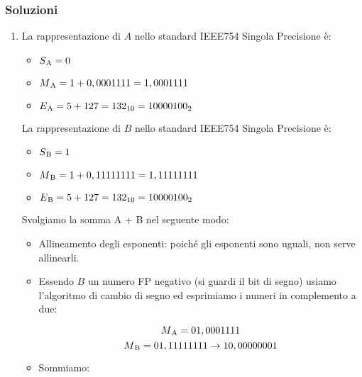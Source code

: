 \documentclass{article}
\begin{document}
\subsubsection{Soluzioni}
\begin{enumerate}
    \item La rappresentazione di $A$ nello standard IEEE754 Singola Precisione è:
        \begin{itemize}
            \item[] $S\textsubscript{A}=0$
            \item[] $M\textsubscript{A}=1+0,0001111=1,0001111$
            \item[] $E\textsubscript{A}=5+127=132\textsubscript{10}=10000100\textsubscript{2}$
        \end{itemize}

    La rappresentazione di $B$ nello standard IEEE754 Singola Precisione è:
    \begin{itemize}
        \item[] $S\textsubscript{B}=1$
        \item[] $M\textsubscript{B}=1+0,11111111=1,11111111$
        \item[] $E\textsubscript{B}=5+127=132\textsubscript{10}=10000100\textsubscript{2}$
    \end{itemize}
    Svolgiamo la somma A + B nel seguente modo:
    \begin{itemize}
        \item Allineamento degli esponenti: poiché gli esponenti sono uguali, non serve allinearli.
        \item Essendo $B$ un numero FP negativo (si guardi il bit di segno) usiamo l'algoritmo di cambio di segno ed esprimiamo i numeri in complemento a due:

$$M\textsubscript{A}=01,0001111$$
$$M\textsubscript{B}=01,11111111 \rightarrow 10,00000001$$
        \item Sommiamo:
        \begin{center}
\end{center}
\end{itemize}
\end{enumerate}
\end{document}

